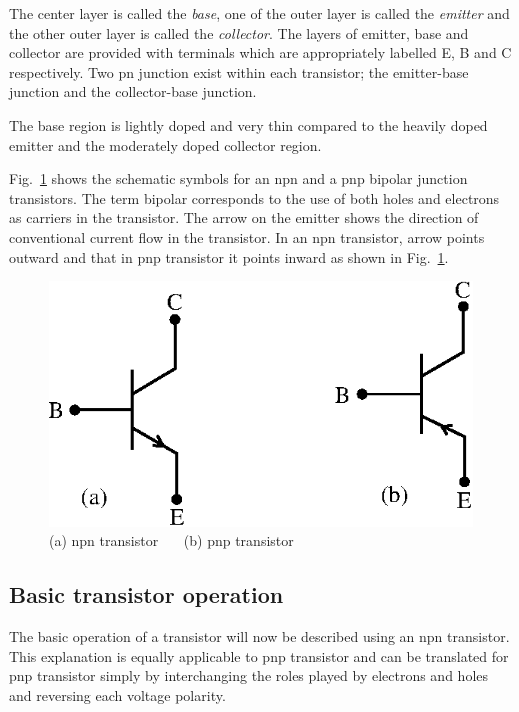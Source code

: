 The center layer is called the {\em base}, one of the outer layer is called the {\em emitter} and the other outer layer is called the {\em collector}. The layers of emitter, base and collector are provided with terminals which are appropriately labelled E, B and C respectively. Two pn junction exist within each transistor; the emitter-base junction and the collector-base junction.

The base region is lightly doped and very thin compared to the heavily doped emitter and the moderately doped collector region.

Fig.~\ref{fig2.2} shows the schematic symbols for an npn and a pnp bipolar junction transistors. The term bipolar corresponds to the use of both holes and electrons as carriers in the transistor. The arrow on the emitter shows the direction of conventional current flow in the transistor. In an npn transistor, arrow points outward and that in pnp transistor it points inward as shown in Fig.~\ref{fig2.2}.
\begin{figure}[H]
\centering
\includegraphics{chap2/fig2.eps}
\caption{(a) npn transistor~~~ (b) pnp transistor}\label{fig2.2}
\end{figure}

\medskip
\subsection{Basic transistor operation}\label{sec2.1.1}

The basic operation of a transistor will now be described using an npn transistor. This explanation is equally applicable to pnp transistor and can be translated for pnp transistor simply by interchanging the roles played by electrons and holes and reversing each voltage polarity.

